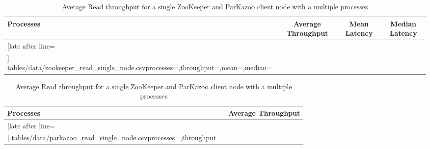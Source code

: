 \begin{table}[ht!]
	\centering
	\begin{subtable}{1.0\linewidth}
		\begin{tabular}{|l|c|c|c|}\hline%
			\textbf{Processes}   & \textbf{Average Throughput} & \textbf{Mean Latency} & \textbf{Median Latency} \\\hline
			\csvreader[late after line=\\\hline]%
			{tables/data/zookeeper_read_single_node.csv}{processes=\processes,throughput=\throughput,mean=\mean,median=\median}%
			{\processes & \throughput & \mean & \median}%
		\end{tabular}
		\caption{ZooKeeper}
		\label{table:single_node_zookeeper_read_throughput}
	\end{subtable}
	\begin{subtable}{1.0\linewidth}
		\begin{tabular}{|l|c|}\hline%
			\textbf{Processes}   & \textbf{Average Throughput} \\\hline
			\csvreader[late after line=\\\hline]%
			{tables/data/parkazoo_read_single_node.csv}{processes=\processes,throughput=\throughput}%
			{\processes & \throughput}%
		\end{tabular}
		\caption{ParKazoo}
		\label{table:single_node_parkazoo_read_throughput}
	\end{subtable}
	\caption{Average Read throughput for a single ZooKeeper and ParKazoo client node with a multiple processes}
	\label{table:single_node_read_throughput}
\end{table}
